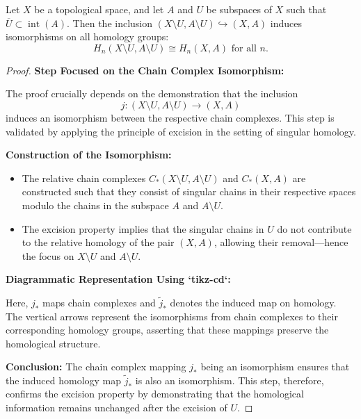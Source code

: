 \begin{theorem}
\label{excisiontheorem}
Let \(X\) be a topological space, and let \(A\) and \(U\) be subspaces of \(X\) such that \(\overline{U} \subset \operatorname{int}(A)\). Then the inclusion \((X \setminus U, A \setminus U) \hookrightarrow (X, A)\) induces isomorphisms on all homology groups:
\[
H_n(X \setminus U, A \setminus U) \cong H_n(X, A) \text{ for all } n.
\]
\end{theorem}

\begin{proof}
\textbf{Step Focused on the Chain Complex Isomorphism:}

The proof crucially depends on the demonstration that the inclusion 
\[j: (X \setminus U, A \setminus U) \to (X, A)\]
induces an isomorphism between the respective chain complexes. This step is validated by applying the principle of excision in the setting of singular homology.

\textbf{Construction of the Isomorphism:}
\begin{itemize}
    \item The relative chain complexes \(C_*(X \setminus U, A \setminus U)\) and \(C_*(X, A)\) are constructed such that they consist of singular chains in their respective spaces modulo the chains in the subspace \(A\) and \(A \setminus U\).
    \item The excision property implies that the singular chains in \(U\) do not contribute to the relative homology of the pair \((X, A)\), allowing their removal—hence the focus on \(X \setminus U\) and \(A \setminus U\).
\end{itemize}

\textbf{Diagrammatic Representation Using `tikz-cd`:}
\begin{center}
\end{center}

Here, \(j_*\) maps chain complexes and \(\tilde{j}_*\) denotes the induced map on homology. The vertical arrows represent the isomorphisms from chain complexes to their corresponding homology groups, asserting that these mappings preserve the homological structure.

\textbf{Conclusion:}
The chain complex mapping \(j_*\) being an isomorphism ensures that the induced homology map \(\tilde{j}_*\) is also an isomorphism. This step, therefore, confirms the excision property by demonstrating that the homological information remains unchanged after the excision of \(U\).

\end{proof}

